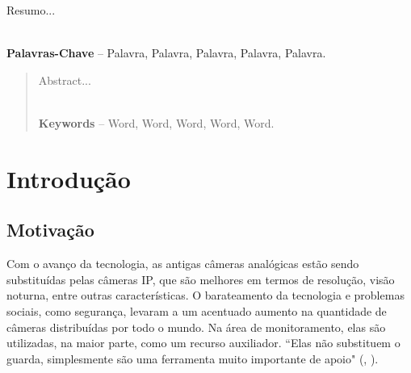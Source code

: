 \documentclass[]{politex}
\begin{document}






\begin{resumo}
Resumo...

\\[3\baselineskip]

\textbf{Palavras-Chave} -- Palavra, Palavra, Palavra, Palavra, Palavra.
\end{resumo}


\begin{abstract}
Abstract...

\\[3\baselineskip]

\textbf{Keywords} -- Word, Word, Word, Word, Word.
\end{abstract}


\listadefiguras
\listadetabelas



\sumario




	
\chapter{Introdução}
\section{Motivação}
Com o avanço da tecnologia, as antigas câmeras analógicas estão sendo substituídas pelas câmeras IP, que são melhores em termos de resolução, visão noturna, entre outras características. O barateamento da tecnologia e problemas sociais, como segurança, levaram a um acentuado aumento na quantidade de câmeras distribuídas por todo o mundo. Na área de monitoramento, elas são utilizadas, na maior parte, como um recurso auxiliador.  “Elas não substituem o guarda, simplesmente são uma ferramenta muito importante de apoio" (, \citeyear{bermudez}).
\end{document}
